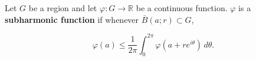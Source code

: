 Let $G$ be a region and let $\varphi: G \to \mathbb{R}$ be a continuous function. $\varphi$ is a \textbf{subharmonic function} if whenever $\bar{B}(a; r) \subset G$,

$$\varphi(a) \leq \frac{1}{2\pi} \int_{0}^{2\pi} \varphi(a + re^{i\theta}) \, d\theta.$$
